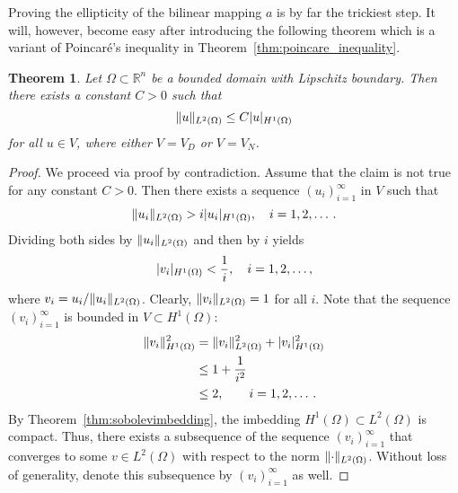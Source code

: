 \documentclass[english, 12pt, a4paper, sci, utf8, a-2b, online]{aaltothesis}
\theoremstyle{definition}
\theoremstyle{plain}
\newtheorem{theorem}{Theorem}[section]
\DeclarePairedDelimiter\abs{\lvert}{\rvert}
\DeclarePairedDelimiter\norm{\lVert}{\rVert}
\numberwithin{equation}{section}
\begin{document}
Proving the ellipticity of the bilinear mapping $a$ is by far the
trickiest step. It will, however, become easy after introducing the following
theorem which is a variant of Poincaré's inequality in
Theorem~\ref{thm:poincare_inequality}.
\begin{theorem}
    \label{thm:friedrichs_inequality}
    Let $\Omega \subset \mathbb{R}^n$ be a bounded domain with Lipschitz
    boundary. Then there exists a constant $C > 0$ such that
    \begin{equation*}
        \norm{u}_{L^2(\Omega)} \leq C \abs{u}_{H^1(\Omega)}
    \end{equation*}
    for all $u \in V$, where either $V = V_D$ or $V = V_N$.
\end{theorem}
\begin{proof}
    We proceed via proof by contradiction.
    Assume that the claim is not true for any constant $C > 0$.
    Then there exists a sequence $(u_i)_{i=1}^{\infty}$ in $V$ such that
    \begin{equation*}
        \norm{u_i}_{L^2(\Omega)} > i \abs{u_i}_{H^1(\Omega)},
        \quad i=1,2,\dotsc.
    \end{equation*}
    Dividing both sides by $\norm{u_i}_{L^2(\Omega)}$
    and then by $i$ yields
    \begin{equation*}
        \abs{v_i}_{H^1(\Omega)} < \frac{1}{i},
        \quad i=1,2,\dotsc,
    \end{equation*}
    where $v_i = u_i / \norm{u_i}_{L^2(\Omega)}$.
    Clearly, $\norm{v_i}_{L^2(\Omega)} = 1$ for all $i$.
    Note that the sequence $(v_i)_{i=1}^{\infty}$ is bounded in
    $V \subset H^1(\Omega)$:
    \begin{align*}
        \norm{v_i}_{H^1(\Omega)}^2
        &= \norm{v_i}_{L^2(\Omega)}^2 + \abs{v_i}_{H^1(\Omega)}^2 \\
        &\leq 1 + \frac{1}{i^2} \\
        &\leq 2,
        \qquad i=1,2,\dotsc.
    \end{align*}
    By Theorem~\ref{thm:sobolevimbedding}, the imbedding
    $H^1(\Omega) \subset L^2(\Omega)$ is compact. Thus, there exists
    a subsequence of the sequence $(v_i)_{i=1}^{\infty}$ that converges
    to some $v \in L^2(\Omega)$ with respect to the norm
    $\norm{\cdot}_{L^2(\Omega)}$. Without loss of generality,
    denote this subsequence by $(v_i)_{i=1}^{\infty}$ as well.


\end{proof}
\end{document}
